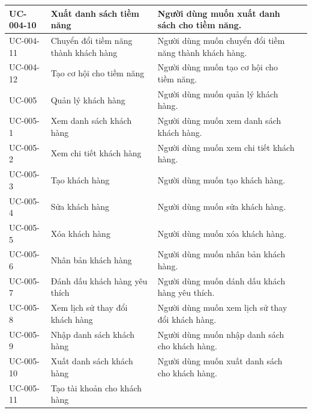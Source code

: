 \documentclass[12pt,a4paper]{article}
\begin{document}
\begin{center}
\begin{longtable}{|p{2.5cm}|p{4.5cm}|p{7.5cm}|c|}
            \\ \hline
            UC-004-10
            & Xuất danh sách tiềm năng
            & Người dùng muốn xuất danh sách cho tiềm năng.
            \\ \hline
            UC-004-11
            & Chuyển đổi tiềm năng thành khách hàng
            & Người dùng muốn chuyển đổi tiềm năng thành khách hàng.
            \\ \hline
            UC-004-12
            & Tạo cơ hội cho tiềm năng
            & Người dùng muốn tạo cơ hội cho tiềm năng.
            \\ \hline
            UC-005
            & Quản lý khách hàng
            & Người dùng muốn quản lý khách hàng.
            \\ \hline
            UC-005-1
            & Xem danh sách khách hàng
            & Người dùng muốn xem danh sách khách hàng.
            \\ \hline
            UC-005-2
            & Xem chi tiết khách hàng
            & Người dùng muốn xem chi tiết khách hàng.
            \\ \hline
            UC-005-3
            & Tạo khách hàng
            & Người dùng muốn tạo khách hàng.
            \\ \hline
            UC-005-4
            & Sửa khách hàng
            & Người dùng muốn sửa khách hàng.
            \\ \hline
            UC-005-5
            & Xóa khách hàng
            & Người dùng muốn xóa khách hàng.
            \\ \hline
            UC-005-6
            & Nhân bản khách hàng
            & Người dùng muốn nhân bản khách hàng.
            \\ \hline
            UC-005-7
            & Đánh dấu khách hàng yêu thích
            & Người dùng muốn dánh dấu khách hàng yêu thích.
            \\ \hline
            UC-005-8
            & Xem lịch sử thay đổi khách hàng
            & Người dùng muốn xem lịch sử thay đổi khách hàng.
            \\ \hline
            UC-005-9
            & Nhập danh sách khách hàng
            & Người dùng muốn nhập danh sách cho khách hàng.
            \\ \hline
            UC-005-10
            & Xuất danh sách khách hàng
            & Người dùng muốn xuất danh sách cho khách hàng.
            \\ \hline
            UC-005-11
            & Tạo tài khoản cho khách hàng

\end{longtable}
\end{center}
\end{document}
